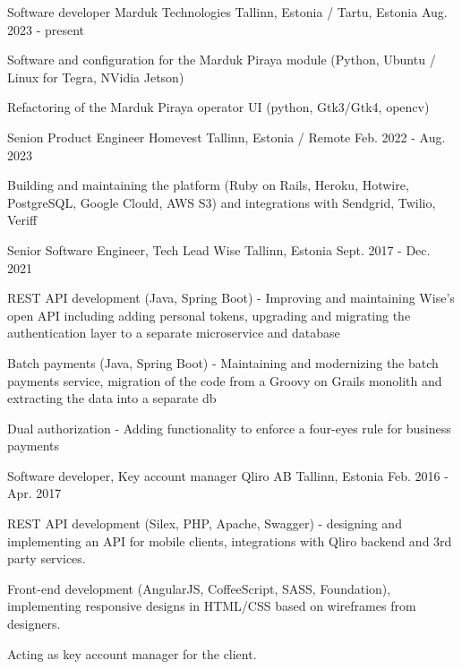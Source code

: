 
\begin{cventries}

  \cventry
    {Software developer}
    {Marduk Technologies}
    {Tallinn, Estonia / Tartu, Estonia}
    {Aug. 2023 - present}
    {
      \begin{cvitems}
        \item { Software and configuration for the Marduk Piraya module (Python, Ubuntu / Linux for Tegra, NVidia Jetson) }
        \item { Refactoring of the Marduk Piraya operator UI (python, Gtk3/Gtk4, opencv) }
      \end{cvitems}
    }

  \cventry
    {Senion Product Engineer}
    {Homevest}
    {Tallinn, Estonia / Remote}
    {Feb. 2022 - Aug. 2023}
    {
      \begin{cvitems}
        \item { Building and maintaining the platform (Ruby on Rails, Heroku, Hotwire, PostgreSQL, Google Clould, AWS S3) and integrations with Sendgrid, Twilio, Veriff }
      \end{cvitems}
    }

  \cventry
    {Senior Software Engineer, Tech Lead}
    {Wise}
    {Tallinn, Estonia}
    {Sept. 2017 - Dec. 2021}
    {
      \begin{cvitems}
        \item { REST API development (Java, Spring Boot) - Improving and maintaining Wise's open API including adding personal tokens, upgrading and migrating the authentication layer to a separate microservice and database}
        \item { Batch payments (Java, Spring Boot) - Maintaining and modernizing the batch payments service, migration of the code from a Groovy on Grails monolith and extracting the data into a separate db}
        \item { Dual authorization - Adding functionality to enforce a four-eyes rule for business payments }
      \end{cvitems}
    }

  \cventry
    {Software developer, Key account manager}
    {Qliro AB}
    {Tallinn, Estonia}
    {Feb. 2016 - Apr. 2017}
    {
      \begin{cvitems}
        \item { REST API development (Silex, PHP, Apache, Swagger) - designing and implementing an API for mobile clients, integrations with Qliro backend and 3rd party services.}
        \item { Front-end development (AngularJS, CoffeeScript, SASS, Foundation), implementing responsive designs in HTML/CSS based on wireframes from designers.}
        \item { Acting as key account manager for the client.}
      \end{cvitems}
    }


\end{cventries}
